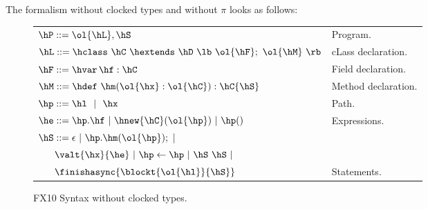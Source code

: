 The formalism without clocked types and without $\pi$ looks as follows:
\begin{figure}[t]
\begin{center}
\begin{tabular}{|l|l|}
\hline

$\hP ::= \ol{\hL},\hS$ & Program. \\

$\hL ::= \hclass ~ \hC~\hextends~\hD~\lb~\ol{\hF};~\ol{\hM}~\rb$
& cLass declaration. \\

$\hF ::= \hvar\,\hf:\hC$
& Field declaration. \\

$\hM ::= \hdef\ \hm(\ol{\hx}:\ol{\hC}):\hC\{\hS\}$
& Method declaration. \\

$\hp ::= \hl ~~|~~ \hx$
& Path. \\ %

$\he ::=  \hp.\hf  ~|~ \hnew{\hC}(\ol{\hp}) ~|~ \hp()$
& Expressions. \\ %
$\hS ::=  \epsilon ~|~  \hp.\hm(\ol{\hp}); ~|~$ &  \\
$~~~~~ \valt{\hx}{\he} ~|~ \hp \leftarrow \hp ~|~ \hS~\hS ~|~  $ &\\
$~~~~~ \finishasync{\blockt{\ol{\hl}}{\hS}} $ & Statements. \\ %

\hline
\end{tabular}
\end{center}
\caption{FX10 Syntax without clocked types.}
\label{Figure:syntax2}
\end{figure}


